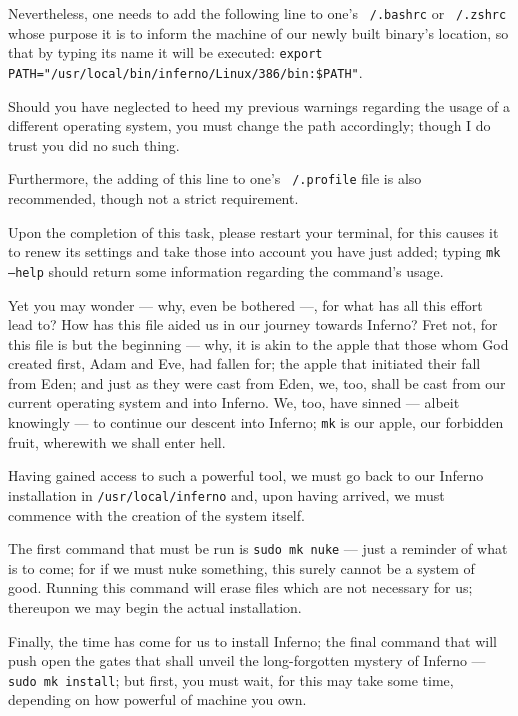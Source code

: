 \documentclass[a4paper,12pt]{report}
\begin{document}
  Nevertheless, one needs to add the following line to one's \texttt{~/.bashrc} or \texttt{~/.zshrc} whose purpose it is to inform the machine of our newly built binary's location, so that by typing its name it will be executed: \texttt{export PATH="/usr/local/bin/inferno/Linux/386/bin:\$PATH"}.

  Should you have neglected to heed my previous warnings regarding the usage of a different operating system, you must change the path accordingly; though I do trust you did no such thing.

  Furthermore, the adding of this line to one's \texttt{~/.profile} file is also recommended, though not a strict requirement.

  Upon the completion of this task, please restart your terminal, for this causes it to renew its settings and take those into account you have just added; typing \texttt{mk --help} should return some information regarding the command's usage.

  Yet you may wonder — why, even be bothered —, for what has all this effort lead to? How has this file aided us in our journey towards Inferno? Fret not, for this file is but the beginning — why, it is akin to the apple that those whom God created first, Adam and Eve, had fallen for; the apple that initiated their fall from Eden; and just as they were cast from Eden, we, too, shall be cast from our current operating system and into Inferno. We, too, have sinned — albeit knowingly — to continue our descent into Inferno; \texttt{mk} is our apple, our forbidden fruit, wherewith we shall enter hell.

  Having gained access to such a powerful tool, we must go back to our Inferno installation in \texttt{/usr/local/inferno} and, upon having arrived, we must commence with the creation of the system itself.

  The first command that must be run is \texttt{sudo mk nuke} — just a reminder of what is to come; for if we must nuke something, this surely cannot be a system of good. Running this command will erase files which are not necessary for us; thereupon we may begin the actual installation.

  Finally, the time has come for us to install Inferno; the final command that will push open the gates that shall unveil the long-forgotten mystery of Inferno — \texttt{sudo mk install}; but first, you must wait, for this may take some time, depending on how powerful of machine you own.
  \newpage

  \thispagestyle{empty}
    \mbox{}
    \newpage
\end{document}
